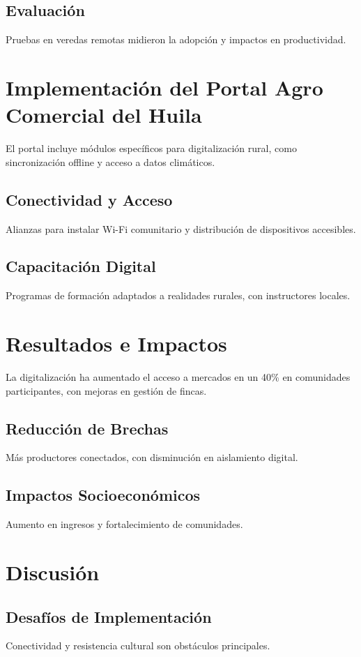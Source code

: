 \subsection{Evaluación}
Pruebas en veredas remotas midieron la adopción y impactos en productividad.

\section{Implementación del Portal Agro Comercial del Huila}

El portal incluye módulos específicos para digitalización rural, como sincronización offline y acceso a datos climáticos.

\subsection{Conectividad y Acceso}
Alianzas para instalar Wi-Fi comunitario y distribución de dispositivos accesibles.

\subsection{Capacitación Digital}
Programas de formación adaptados a realidades rurales, con instructores locales.

\section{Resultados e Impactos}

La digitalización ha aumentado el acceso a mercados en un 40\% en comunidades participantes, con mejoras en gestión de fincas.

\subsection{Reducción de Brechas}
Más productores conectados, con disminución en aislamiento digital.

\subsection{Impactos Socioeconómicos}
Aumento en ingresos y fortalecimiento de comunidades.

\section{Discusión}

\subsection{Desafíos de Implementación}
Conectividad y resistencia cultural son obstáculos principales.

